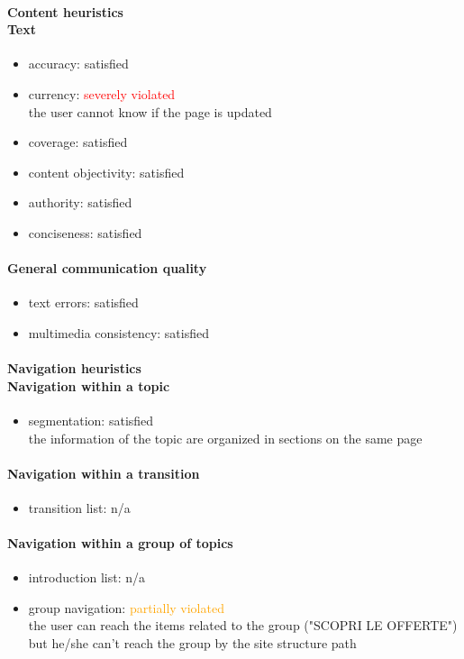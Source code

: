 \begin{enumerate}
	\paragraph*{Content heuristics \\ Text}
	\begin{itemize}
		\item accuracy: satisfied
		\item currency:  \textcolor{red}{severely violated}\\
		the user cannot know if the page is updated
		\item coverage: satisfied
		\item content objectivity: satisfied
		\item authority: satisfied
		\item conciseness: satisfied		
	\end{itemize}

	\paragraph*{General communication quality}
	\begin{itemize}
		\item text errors: satisfied
		\item multimedia consistency: satisfied
	\end{itemize}

	\paragraph*{Navigation heuristics \\ Navigation within a topic}
	\begin{itemize}
		\item segmentation: satisfied\\
		the information of the topic are organized in sections on the same page
	\end{itemize}	
	
	\paragraph*{Navigation within a transition}
	\begin{itemize}
		\item transition list: n/a
	\end{itemize}
	
	\paragraph*{Navigation within a group of topics}
	\begin{itemize}
		\item introduction list: n/a
		\item group navigation: \textcolor{orange}{partially violated}\\
		the user can reach the items related to the group ("SCOPRI LE OFFERTE") but he/she can't reach the group by the site structure path 
	\end{itemize}


\end{enumerate}

